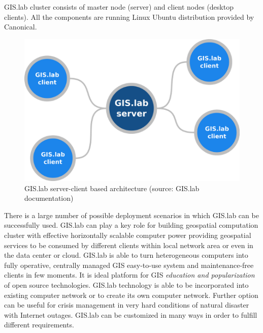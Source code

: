 \documentclass{isprs}
\begin{document}
GIS.lab cluster consists of master node (server) and client nodes
(desktop clients). All the components are running Linux Ubuntu
distribution provided by Canonical.

\begin{figure}[ht!]
\begin{center}
  \includegraphics[width=.7\columnwidth]{figures/gislab-server-client-architecture.png}
  \caption{GIS.lab server-client based architecture (source: GIS.lab
    documentation)}
\label{fig:gislab_infrastructure}
\end{center}
\end{figure}

There is a large number of possible deployment scenarios in which
GIS.lab can be successfully used. GIS.lab can play a key role for
building geospatial computation cluster with effective horizontally
scalable computer power providing geospatial services to be consumed
by different clients within local network area or even in the data
center or cloud. GIS.lab is able to turn heterogeneous computers into
fully operative, centrally managed GIS easy-to-use system and
maintenance-free clients in few moments. It is ideal platform for GIS
\textit{education and popularization} of open source
technologies. GIS.lab technology is able to be incorporated into
existing computer network or to create its own computer
network. Further option can be useful for crisis management in very
hard conditions of natural disaster with Internet outages. GIS.lab can
be customized in many ways in order to fulfill different requirements.
\end{document}
